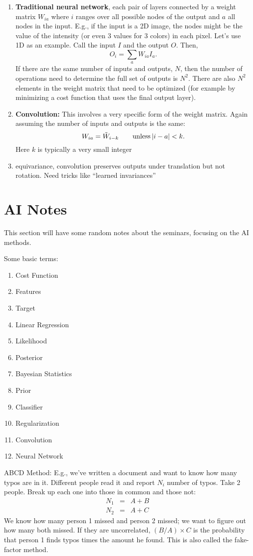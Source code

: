 \documentclass[prd,amsmath,aps,floats,amssymb, floatfix,
  superscriptaddress,nofootinbib]{revtex4-1}
\def\vs{\nonumber\\}
\numberwithin{equation}{section}
\newcommand\be{\begin{equation}}
\newcommand\ee{\end{equation}}
\def\bea{\begin{eqnarray}}
\def\eea{\end{eqnarray}}
\newcommand\bee{\begin{enumerate}}
\newcommand\eee{\end{enumerate}}
\begin{document}
 \bee
 \item {\bf Traditional neural network}, each pair of layers connected by a weight matrix $W_{ia}$ where $i$ ranges over all possible nodes of the output and $a$ all nodes in the input. E.g., if the input is a 2D image, the nodes might be the value of the intensity (or even 3 values for 3 colors) in each pixel. Let's use 1D as an example. Call the input $I$ and the output $O$. Then,
 \be
 O_i = \sum_a W_{ia} I_a
 .\ee
 If there are the same number of inputs and outputs, $N$, then the number of operations need to determine the full set of outputs is $N^2$. There are also $N^2$ elements in the weight matrix that need to be optimized (for example by minimizing a cost function that uses the final output layer). 
 \item {\bf Convolution:} This involves a very specific form of the weight matrix. Again assuming the number of inputs and outputs is the same:
 \be
 W_{ia} = \tilde W_{i-k} \qquad {\rm unless}\, |i-a|<k.\ee
 Here $k$ is typically a very small integer
 \item equivariance, convolution preserves outputs under translation but not rotation. Need tricks like ``learned invariances''
 \eee
 

 
 \appendix
 
  
 \section{AI Notes}\label{sec:unblind}
 This section will have some random notes about the seminars, focusing on the AI methods. 
 
 Some basic terms:
 \bee
 \item Cost Function
 \item Features
 \item Target
 \item Linear Regression
 \item Likelihood
 \item Posterior
 \item Bayesian Statistics
 \item Prior
 \item Classifier
 \item Regularization
 \item Convolution
 \item Neural Network
  \eee
  
  ABCD Method: E.g., we've written a document and want to know how many typos are in it. Different people read it and report $N_i$ number of typos. Take 2 people. Break up each one into those in common and those not:
  \bea
  N_1&=&A+B\vs
  N_2&=&A+C
  \eea
  We know how many person 1 missed and person 2 missed; we want to figure out how many both missed. If they are uncorrelated, $(B/A)\times C$ is the probability that person 1 finds typos times the amount he found. This is also called the fake-factor method.
 
\end{document}
